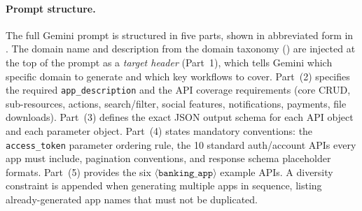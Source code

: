 \paragraph{Prompt structure.}
The full Gemini prompt is structured in five parts, shown in abbreviated form in . The domain name and description from the domain taxonomy () are injected at the top of the prompt as a \emph{target header} (Part~1), which tells Gemini which specific domain to generate and which key workflows to cover. Part~(2) specifies the required \texttt{app\_description} and the API coverage requirements (core CRUD, sub-resources, actions, search/filter, social features, notifications, payments, file downloads). Part~(3) defines the exact JSON output schema for each API object and each parameter object. Part~(4) states mandatory conventions: the \texttt{access\_token} parameter ordering rule, the 10 standard auth/account APIs every app must include, pagination conventions, and response schema placeholder formats. Part~(5) provides the six $\langle\mathtt{banking\_app}\rangle$ example APIs. A diversity constraint is appended when generating multiple apps in sequence, listing already-generated app names that must not be duplicated.

